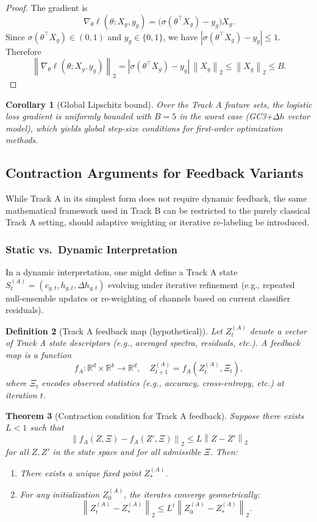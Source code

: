 \documentclass[11pt]{article}
\newtheorem{definition}{Definition}[section]
\newtheorem{theorem}[definition]{Theorem}
\newtheorem{corollary}[definition]{Corollary}
\newcommand{\R}{\mathbb{R}}
\newcommand{\norm}[1]{\left\lVert #1 \right\rVert}
\newcommand{\abs}[1]{\left\lvert #1 \right\rvert}
\begin{document}
\begin{proof}
The gradient is
\[
  \nabla_\theta \ell(\theta; X_g, y_g) = \bigl(\sigma(\theta^\top X_g) - y_g\bigr) X_g.
\]
Since \(\sigma(\theta^\top X_g) \in (0,1)\) and \(y_g \in \{0,1\}\), we have \(\abs{\sigma(\theta^\top X_g) - y_g} \le 1\).
Therefore
\[
  \norm{\nabla_\theta \ell(\theta; X_g, y_g)}_2
  = \abs{\sigma(\theta^\top X_g) - y_g}\,\norm{X_g}_2
  \le \norm{X_g}_2 \le B.
\]
\end{proof}

\begin{corollary}[Global Lipschitz bound]
Over the Track A feature sets, the logistic loss gradient is uniformly bounded with \(B = 5\) in the worst case (GC3+\(\Delta h\) vector model), which yields global step-size conditions for first-order optimization methods.
\end{corollary}

\subsection{Contraction Arguments for Feedback Variants}

While Track A in its simplest form does not require dynamic feedback, the same mathematical framework used in Track B can be restricted to the purely classical Track A setting, should adaptive weighting or iterative re-labeling be introduced.

\subsubsection{Static vs.\ Dynamic Interpretation}

In a dynamic interpretation, one might define a Track A state \(S_t^{(A)} = (c_{g,t}, h_{g,t}, \Delta h_{g,t})\) evolving under iterative refinement (e.g., repeated null-ensemble updates or re-weighting of channels based on current classifier residuals).

\begin{definition}[Track A feedback map (hypothetical)]
Let \(Z_t^{(A)}\) denote a vector of Track A state descriptors (e.g., averaged spectra, residuals, etc.).
A feedback map is a function
\[
  f_A : \R^d \times \R^k \to \R^d, \quad Z_{t+1}^{(A)} = f_A(Z_t^{(A)}, \Xi_t),
\]
where \(\Xi_t\) encodes observed statistics (e.g., accuracy, cross-entropy, etc.) at iteration \(t\).
\end{definition}

\begin{theorem}[Contraction condition for Track A feedback]
Suppose there exists \(L < 1\) such that
\[
  \norm{f_A(Z, \Xi) - f_A(Z', \Xi)}_2 \le L \norm{Z - Z'}_2
\]
for all \(Z,Z'\) in the state space and for all admissible \(\Xi\).
Then:
\begin{enumerate}
  \item There exists a unique fixed point \(Z_\ast^{(A)}\).
  \item For any initialization \(Z_0^{(A)}\), the iterates converge geometrically:
  \[
    \norm{Z_t^{(A)} - Z_\ast^{(A)}}_2 \le L^t \norm{Z_0^{(A)} - Z_\ast^{(A)}}_2.
  \]
\end{enumerate}
\end{theorem}
\end{document}
